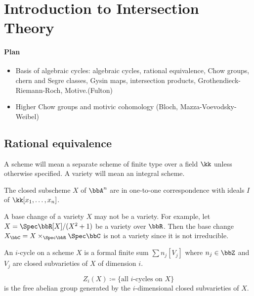 \section{Introduction to Intersection Theory}

\paragraph{Plan}
\begin{itemize}
    \item [I] Basis of algebraic cycles:
    algebraic cycles, rational equivalence, Chow groups, chern and Segre classes, Gysin maps, intersection products, Grothendieck-Riemann-Roch, Motive.(Fulton)
    \item[II] Higher Chow groups and motivic cohomology (Bloch, Mazza-Voevodsky-Weibel)
\end{itemize}

\subsection{Rational equivalence}

    A scheme will mean a separate scheme of finite type over a field \(\kk\) unless otherwise specified. 
    A variety will mean an integral scheme.

    \begin{example}
        The closed subscheme \(X\) of \(\bbA^n\) are in one-to-one correspondence with ideals \(I\) of \(\kk[x_1,\dots,x_n]\).
    \end{example}

    \begin{example}
        A base change of a variety \(X\) may not be a variety. 
        For example, let \(X = \Spec \bbR[X]/(X^2+1)\) be a variety over \(\bbR\). 
        Then the base change \(X_{\bbC} = X \times_{\Spec \bbR} \Spec \bbC\) is not a variety since it is not irreducible.
    \end{example}

    \begin{definition}
        An \(i\)-cycle on a scheme \(X\) is a formal finite sum \(\sum n_j [V_j]\) where \(n_j \in \bbZ\) and \(V_j\) are closed subvarieties of \(X\) of dimension \(i\).
    \end{definition}

    \begin{definition}
        \[ Z_i(X) \coloneqq \{\text{all } i\text{-cycles on } X\} \]
        is the free abelian group generated by the \(i\)-dimensional closed subvarieties of \(X\).
    \end{definition}

